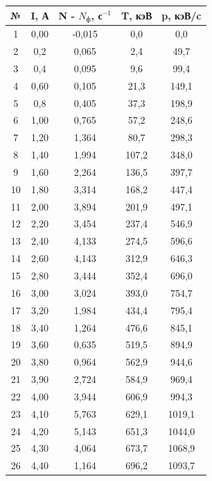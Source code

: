 \documentclass[12pt,a4paper]{article}
\begin{document}
     \begin{center} \begin{Large}
\begin{tabular}{|c|c|c|c|c|}
     \hline 
     № & I, А & N - $N_\text{ф}$, с$^{-1}$ & T, кэВ & p, кэВ/c \\ 
     \hline 
     1 & 0,00 & -0,015 & 0,0 & 0,0 \\ 
     \hline 
     2 & 0,2 & 0,065 & 2,4 & 49,7 \\ 
     \hline 
     3 & 0,4 & 0,095 & 9,6 & 99,4 \\ 
     \hline 
     4 & 0,60 & 0,105 & 21,3 & 149,1 \\ 
     \hline 
     5 & 0,8 & 0,405 & 37,3 & 198,9 \\ 
     \hline 
     6 & 1,00 & 0,765 & 57,2 & 248,6 \\ 
     \hline 
     7 & 1,20 & 1,364 & 80,7 & 298,3 \\ 
     \hline 
     8 & 1,40 & 1,994 & 107,2 & 348,0 \\ 
     \hline 
     9 & 1,60 & 2,264 & 136,5 & 397,7 \\ 
     \hline 
     10 & 1,80 & 3,314 & 168,2 & 447,4 \\ 
     \hline 
     11 & 2,00 & 3,894 & 201,9 & 497,1 \\ 
     \hline 
     12 & 2,20 & 3,454 & 237,4 & 546,9 \\ 
     \hline 
     13 & 2,40 & 4,133 & 274,5 & 596,6 \\ 
     \hline 
     14 & 2,60 & 4,143 & 312,9 & 646,3 \\ 
     \hline 
     15 & 2,80 & 3,444 & 352,4 & 696,0 \\ 
     \hline 
     16 & 3,00 & 3,024 & 393,0 & 754,7 \\ 
     \hline 
     17 & 3,20 & 1,984 & 434,4 & 795,4 \\ 
     \hline 
     18 & 3,40 & 1,264 & 476,6 & 845,1 \\ 
     \hline 
     19 & 3,60 & 0,635 & 519,5 & 894,9 \\ 
     \hline 
     20 & 3,80 & 0,964 & 562,9 & 944,6 \\ 
     \hline 
     21 & 3,90 & 2,724 & 584,9 & 969,4 \\ 
     \hline 
     22 & 4,00 & 3,944 & 606,9 & 994,3 \\ 
     \hline 
     23 & 4,10 & 5,763 & 629,1 & 1019,1 \\ 
     \hline 
     24 & 4,20 & 5,143 & 651,3 & 1044,0 \\ 
     \hline 
     25 & 4,30 & 4,064 & 673,7 & 1068,9 \\ 
     \hline 
     26 & 4,40 & 1,164 & 696,2 & 1093,7 \\ 
     \hline 
     \end{tabular}      
     \end{Large}
     \end{center}
\end{document}
